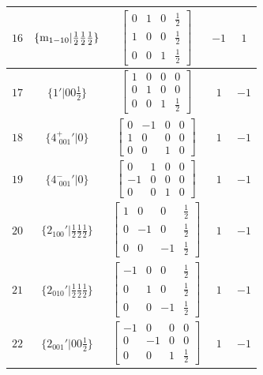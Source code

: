 \documentclass[fleqn,8pt]{jsarticle}
\begin{document}
\begin{longtable}{ccccc}
$ 16 $ & $ \{{\rm m}_{1-10}|\frac{1}{2} \frac{1}{2} \frac{1}{2}\} $ & $ \begin{bmatrix} 0 & 1 & 0 & \frac{1}{2} \\ 1 & 0 & 0 & \frac{1}{2} \\ 0 & 0 & 1 & \frac{1}{2} \end{bmatrix} $ & $ -1 $ & $ 1 $ \\ \hline
$ 17 $ & $ \{1{}'|0 0 \frac{1}{2}\} $ & $ \begin{bmatrix} 1 & 0 & 0 & 0 \\ 0 & 1 & 0 & 0 \\ 0 & 0 & 1 & \frac{1}{2} \end{bmatrix} $ & $ 1 $ & $ -1 $ \\ \hline
$ 18 $ & $ \{4^{+}_{\,\,001}{}'|0\} $ & $ \begin{bmatrix} 0 & -1 & 0 & 0 \\ 1 & 0 & 0 & 0 \\ 0 & 0 & 1 & 0 \end{bmatrix} $ & $ 1 $ & $ -1 $ \\ \hline
$ 19 $ & $ \{4^{-}_{\,\,001}{}'|0\} $ & $ \begin{bmatrix} 0 & 1 & 0 & 0 \\ -1 & 0 & 0 & 0 \\ 0 & 0 & 1 & 0 \end{bmatrix} $ & $ 1 $ & $ -1 $ \\ \hline
$ 20 $ & $ \{2{}_{100}{}'|\frac{1}{2} \frac{1}{2} \frac{1}{2}\} $ & $ \begin{bmatrix} 1 & 0 & 0 & \frac{1}{2} \\ 0 & -1 & 0 & \frac{1}{2} \\ 0 & 0 & -1 & \frac{1}{2} \end{bmatrix} $ & $ 1 $ & $ -1 $ \\ \hline
$ 21 $ & $ \{2{}_{010}{}'|\frac{1}{2} \frac{1}{2} \frac{1}{2}\} $ & $ \begin{bmatrix} -1 & 0 & 0 & \frac{1}{2} \\ 0 & 1 & 0 & \frac{1}{2} \\ 0 & 0 & -1 & \frac{1}{2} \end{bmatrix} $ & $ 1 $ & $ -1 $ \\ \hline
$ 22 $ & $ \{2{}_{001}{}'|0 0 \frac{1}{2}\} $ & $ \begin{bmatrix} -1 & 0 & 0 & 0 \\ 0 & -1 & 0 & 0 \\ 0 & 0 & 1 & \frac{1}{2} \end{bmatrix} $ & $ 1 $ & $ -1 $ \\ \hline

\end{longtable}
\end{document}
